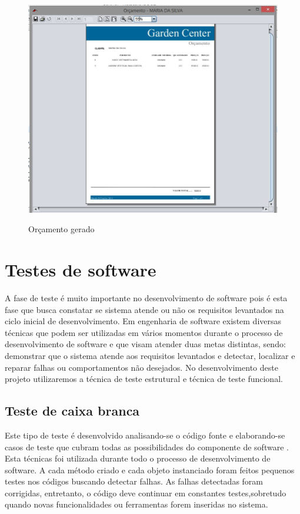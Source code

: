 \begin{figure}[H]
\centering
\caption{Orçamento gerado}
\includegraphics[width=17cm]{imagens/telas/OrcamentoGerado}
\label{fig:Orçamento Gerado}
\end{figure}  
        
\section{Testes de software}  

A fase de teste é muito importante no desenvolvimento de software pois é esta fase que busca constatar se sistema atende ou não os requisitos levantados na ciclo inicial de desenvolvimento.
Em engenharia de software existem diversas técnicas que podem ser utilizadas em vários momentos durante o processo de desenvolvimento de software e que visam atender duas metas distintas, sendo: demonstrar que o sistema atende aos requisitos levantados e detectar, localizar e reparar falhas ou comportamentos não desejados. No desenvolvimento deste projeto utilizaremos a técnica de teste estrutural e técnica de teste funcional. 

\subsection{Teste de caixa branca}

Este tipo de teste é desenvolvido analisando-se o código fonte e elaborando-se casos de teste que cubram todas as possibilidades
do componente de software \cite{neto2007introduccao}.
Esta técnicas foi utilizada durante todo o processo de desenvolvimento de software. A cada método criado e cada objeto instanciado foram feitos pequenos testes nos códigos buscando detectar falhas. As falhas detectadas foram corrigidas, entretanto, o código deve continuar em constantes testes,sobretudo quando novas funcionalidades ou ferramentas forem inseridas no sistema. 
      

